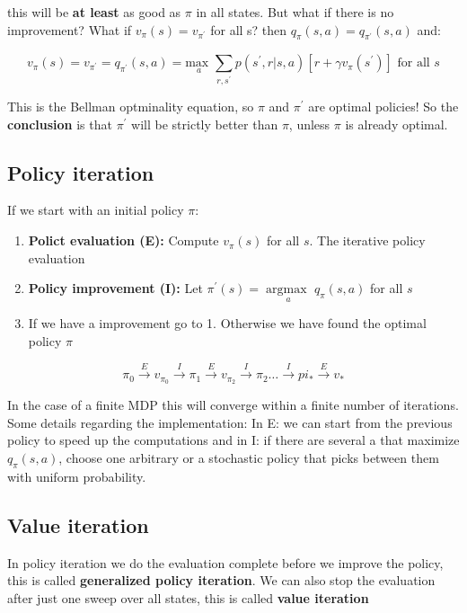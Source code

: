 this will be \textbf{at least} as good as $\pi$ in all states. But what if there is no improvement? What if $v_\pi(s) = v_{\pi^{\prime}}$ for all s? then $q_\pi(s,a) = q_{\pi^{\prime}}(s,a)$ and:

	\begin{equation}
		v_\pi(s) = v_{\pi^{\prime}} = q_{\pi^{\prime}}(s,a) = \underset{a}{\text{max }} \sum_{r, s^{\prime}}^{} p(s^{\prime},r|s,a) [r + \gamma v_\pi(s^{\prime})] \text{ for all }s
	\end{equation}

This is the Bellman optminality equation, so $\pi$ and $\pi^{\prime}$ are optimal policies! So the \textbf{conclusion} is that $\pi^{\prime}$ will be strictly better than $\pi$, unless $\pi$ is already optimal. 


\subsection{Policy iteration}
If we start with an initial policy $\pi$:

	\begin{enumerate}
	 	\item \textbf{Polict evaluation (E):} Compute $v_\pi(s)$ for all $s$. The iterative policy evaluation
	 	\item \textbf{Policy improvement (I):} Let $\pi^{\prime}(s) = \underset{a}{\arg \text{max }} q_\pi(s,a)$ for all $s$
	 	\item If we have a improvement go to 1. Otherwise we have found the optimal policy $\pi$  
	 \end{enumerate} 

	\begin{equation}
		\pi_0 \overset{E}{\rightarrow}v_{\pi_0} \overset{I}{\rightarrow} \pi_1 \overset{E}{\rightarrow} v_{\pi_2} \overset{I}{\rightarrow} \pi_2 \ldots \overset{I}{\rightarrow} pi_* \overset{E}{\rightarrow} v_*
	\end{equation}

In the case of a finite MDP this will converge within a finite number of iterations. Some details regarding the implementation: In E: we can start from the previous policy to speed up the computations and in I: if there are several a that maximize $q_\pi(s,a)$, choose one arbitrary or a stochastic policy that picks between them with uniform probability. 

\subsection{Value iteration}
In policy iteration we do the evaluation complete before we improve the policy, this is called \textbf{generalized policy iteration}. We can also stop the evaluation after just one sweep over all states, this is called \textbf{value iteration}

